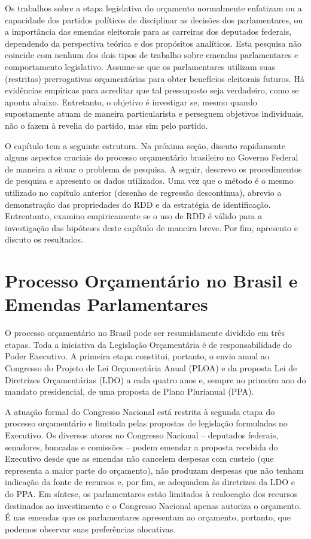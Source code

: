 Os trabalhos sobre a etapa legislativa do orçamento normalmente enfatizam ou a capacidade dos partidos políticos de disciplinar as decisões dos parlamentares, ou a importância das emendas eleitorais para as carreiras dos deputados federais, dependendo da perspectiva teórica e dos propósitos analíticos. Esta pesquisa não coincide com nenhum dos dois tipos de trabalho sobre emendas parlamentares e comportamento legislativo. Assume-se que os parlamentares utilizam suas (restritas) prerrogativas orçamentárias para obter benefícios eleitorais futuros. Há evidências empíricas para acreditar que tal pressuposto seja verdadeiro, como se aponta abaixo. Entretanto, o objetivo é investigar se, mesmo quando supostamente atuam de maneira particularista e perseguem objetivos individuais, não o fazem à revelia do partido, mas sim pelo partido.

O capítulo tem a seguinte estrutura. Na próxima seção, discuto rapidamente alguns aspectos cruciais do processo orçamentário brasileiro no Governo Federal de maneira a situar o problema de pesquisa. A seguir, descrevo os procedimentos de pesquisa e apresento os dados utilizados. Uma vez que o método é o mesmo utilizado no capítulo anterior (desenho de regressão descontínua), abrevio a demonstração das propriedades do RDD e da estratégia de identificação. Entrentanto, examino empiricamente se o uso de RDD é válido para a investigação das hipóteses deste capítulo de maneira breve. Por fim, apresento e discuto os resultados.

\section{Processo Orçamentário no Brasil e Emendas Parlamentares}

O processo orçamentário no Brasil pode ser resumidamente dividido em três etapas. Toda a iniciativa da Legislação Orçamentária é de responsabilidade do Poder Executivo. A primeira etapa constitui, portanto, o envio anual ao Congresso do Projeto de Lei Orçamentária Anual (PLOA) e da proposta Lei de Diretrizes Orçamentárias (LDO) a cada quatro anos e, sempre no primeiro ano do mandato presidencial, de uma proposta de Plano Plurianual (PPA).

A atuação formal do Congresso Nacional está restrita à segunda etapa do processo orçamentário e limitada pelas propostas de legislação formuladas no Executivo. Os diversos atores no Congresso Nacional -- deputados federais, senadores, bancadas e comissões -- podem emendar a proposta recebida do Executivo desde que as emendas não cancelem despesas com custeio (que representa a maior parte do orçamento), não produzam despesas que não tenham indicação da fonte de recursos e, por fim, se adequadem às diretrizes da LDO e do PPA. Em síntese, os parlamentares estão limitados à realocação dos recursos destinados ao investimento e o Congresso Nacional apenas autoriza o orçamento. É nas emendas que os parlamentares apresentam ao orçamento, portanto, que podemos observar suas preferências alocativas.


